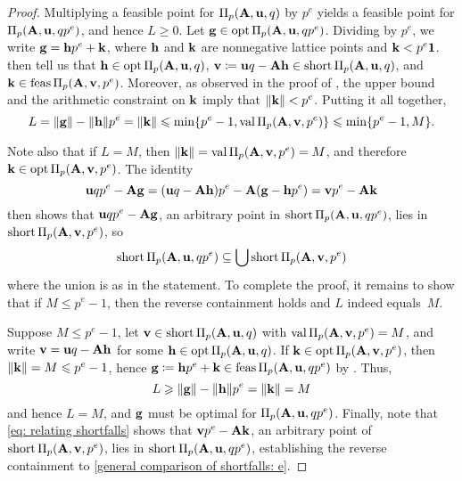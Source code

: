 \documentclass{article}
\begin{document}
\begin{proof}
   Multiplying a feasible point for $\Pi_p(\mathbf{A}, \mathbf{u}, q)$ by $p^e$ yields a feasible point for $\Pi_p(\mathbf{A}, \mathbf{u}, qp^e)$, and hence $L\geq 0$.
   Let $\mathbf{g} \in \operatorname{opt} \Pi_p(\mathbf{A}, \mathbf{u}, qp^e)$.
   Dividing by $p^e$, we write $\mathbf{g} = \mathbf{h} p^e + \mathbf{k}$,
   where $\mathbf{h}$ and $\mathbf{k}$ are nonnegative lattice points and $\mathbf{k} < p^e \mathbf{1}$.
    then tell us that $\mathbf{h} \in \operatorname{opt} \Pi_p(\mathbf{A},\mathbf{u},q)$, $\mathbf{v} \coloneqq \mathbf{u}q - \mathbf{A} \mathbf{h} \in \operatorname{short} \Pi_p(\mathbf{A},\mathbf{u},q)$, and $\mathbf{k} \in \operatorname{feas} \Pi_p(\mathbf{A},\mathbf{v},p^e)$.
   Moreover, as observed in the proof of , the upper bound and the arithmetic constraint on $\mathbf{k}$ imply that $\| \mathbf{k} \| < p^e$.
   Putting it all together, 
   \[ L = \| \mathbf{g} \|-\| \mathbf{h} \|p^e = \| \mathbf{k} \| \leqslant \min \{ p^e-1, \operatorname{val} \Pi_p(\mathbf{A}, \mathbf{v}, p^e) \} \leqslant \min \{ p^e-1, M \}.\]

   Note also that if $L=M$, then $\| \mathbf{k} \| = \operatorname{val} \Pi_p(\mathbf{A},\mathbf{v},p^e) = M$, and therefore $\mathbf{k} \in \operatorname{opt}\Pi_p(\mathbf{A},\mathbf{v},p^e)$.
   The identity
   \begin{equation}
      \label{eq: relating shortfalls}
      \mathbf{u}qp^e-\mathbf{A} \mathbf{g} =
      (\mathbf{u}q-\mathbf{A}\mathbf{h})p^e-\mathbf{A}(\mathbf{g}-\mathbf{h}p^e) = 
      \mathbf{v}p^e-\mathbf{A}\mathbf{k}
   \end{equation}
   then shows that $\mathbf{u}qp^e-\mathbf{A} \mathbf{g}$, an arbitrary point in $\operatorname{short}\Pi_p(\mathbf{A}, \mathbf{u},q p^e)$, lies in $\operatorname{short} \Pi_p(\mathbf{A}, \mathbf{v},p^e)$, so
   \begin{equation}
      \label{general comparison of shortfalls: e}
      \operatorname{short} \Pi_p(\mathbf{A}, \mathbf{u}, qp^e) \subseteq \bigcup \operatorname{short} \Pi_p(\mathbf{A}, \mathbf{v}, p^e)
   \end{equation}
   where the union is as in the statement.
   To complete the proof, it remains to show that if $M\le p^e-1$, then the reverse containment holds and $L$ indeed equals~$M$.
   
   Suppose $M \le p^e-1$, let $\mathbf{v} \in \operatorname{short} \Pi_p(\mathbf{A}, \mathbf{u}, q)$ with $\operatorname{val}\Pi_p(\mathbf{A},\mathbf{v},p^e)=M$, and write $\mathbf{v} = \mathbf{u}q - \mathbf{A} \mathbf{h}$ for some $\mathbf{h} \in \operatorname{opt} \Pi_p(\mathbf{A}, \mathbf{u}, q)$.
   If $\mathbf{k} \in \operatorname{opt} \Pi_p(\mathbf{A}, \mathbf{v}, p^e)$, then $\| \mathbf{k} \| = M \leqslant p^e-1$, hence  $\mathbf{g} \coloneqq \mathbf{h} p^e + \mathbf{k} \in \operatorname{feas} \Pi_p(\mathbf{A},\mathbf{u},qp^e)$ by .
   Thus,
   \[ L \geqslant \| \mathbf{g} \| - \| \mathbf{h} \|p^e = \| \mathbf{k} \| = M \]
   and hence $L=M$, and $\mathbf{g}$ must be optimal for $\Pi_p(\mathbf{A},\mathbf{u},qp^e)$.
   Finally, note that \eqref{eq: relating shortfalls} shows that $\mathbf{v}p^e - \mathbf{A}\mathbf{k}$, an arbitrary point of $\operatorname{short} \Pi_p(\mathbf{A},\mathbf{v},p^e)$, lies in $\operatorname{short}\Pi_p(\mathbf{A},\mathbf{u},qp^e)$, establishing the reverse containment to \eqref{general comparison of shortfalls: e}.
\end{proof}
\end{document}
